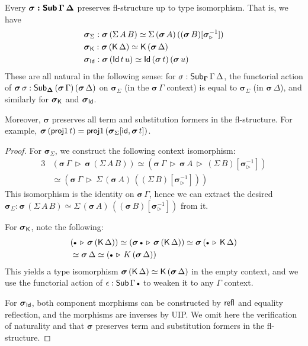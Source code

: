 \documentclass[sigplan,review,anonymous]{acmart}\settopmatter{printfolios=true,printccs=false,printacmref=false}
\newcommand{\ext}{\triangleright}
\newcommand{\emptycon}{\scaleobj{.75}\bullet}
\newcommand{\bGamma}{\boldsymbol{\Gamma}}
\newcommand{\bDelta}{\boldsymbol{\Delta}}
\newcommand{\bsigma}{\boldsymbol{\sigma}}
\begin{document}
\begin{theorem}\label{thm:flpres} Every $\boldsymbol{\sigma : \mathsf{Sub}\,\Gamma\,\Delta}$ preserves fl-structure up to type isomorphism. That is, we have
\begin{alignat*}{3}
  & \bsigma_{\Sigma} : \bsigma\,(\Sigma\,A\,B) \simeq \Sigma\,(\bsigma\,A)\,((\bsigma\,B)[\bsigma_{\ext}^{-1}]) \\
  & \bsigma_{\K} : \bsigma\,(\K\,\Delta) \simeq \K\,(\bsigma\,\Delta) \\
  & \bsigma_{\Id} : \bsigma\,(\Id\,t\,u) \simeq \Id\,(\bsigma\,t)\,(\bsigma\,u)
\end{alignat*}
These are all natural in the following sense: for $\sigma :
\Sub_{\bGamma}\,\Gamma\,\Delta$, the functorial action of $\bsigma\,\sigma :
\Sub_{\bDelta}\,(\bsigma\,\Gamma)\,(\bsigma\,\Delta)$ on $\bsigma_{\Sigma}$ (in
the $\bsigma\,\Gamma$ context) is equal to $\bsigma_{\Sigma}$ (in
$\bsigma\,\Delta$), and similarly for $\bsigma_{\K}$ and $\bsigma_{\Id}$.

Moreover, $\bsigma$ preserves all term and substitution formers in the
fl-structure. For example, $\bsigma\,(\proj1\,t) = \proj1\,
(\bsigma_{\Sigma}[\id, \bsigma\,t])$.
\end{theorem}
\begin{proof}
For $\bsigma_{\Sigma}$, we construct the following context isomorphism:
\begin{alignat*}{3}
& (\bsigma\,\Gamma\,\ext\,\bsigma\,(\Sigma\,A\,B)) \simeq
  (\bsigma\,\Gamma\,\ext\,\bsigma\,A\,\ext\,(\Sigma\,B)[\bsigma_{\ext}^{-1}]) \\
& \simeq (\bsigma\,\Gamma\,\ext\,\Sigma\,(\bsigma\,A)\,((\Sigma\,B)[\bsigma_{\ext}^{-1}]))
\end{alignat*}
This isomorphism is the identity on $\bsigma\,\Gamma$, hence we can extract the
desired $\bsigma_{\Sigma} : \bsigma\,(\Sigma\,A\,B) \simeq
\Sigma\,(\bsigma\,A)\,((\bsigma\,B)[\bsigma_{\ext}^{-1}])$ from it.

For $\bsigma_{\K}$, note the following:
\begin{alignat*}{3}
  & (\emptycon\,\ext\,\bsigma\,(\K\,\Delta)) \simeq
    (\bsigma\,\emptycon\,\ext\,\bsigma\,(\K\,\Delta)) \simeq
    \bsigma\,(\emptycon\,\ext\,\K\,\Delta)\\
  & \simeq \bsigma\,\Delta \simeq (\emptycon\,\ext\,K\,(\bsigma\,\Delta))
\end{alignat*}
This yields a type isomorphism $\bsigma\,(\K\,\Delta) \simeq
\K\,(\bsigma\,\Delta)$ in the empty context, and we use the functorial action of
$\epsilon : \Sub\,\Gamma\,\emptycon$ to weaken it to any $\Gamma$ context.

For $\bsigma_{\Id}$, both component morphisms can be constructed by $\mathsf{refl}$ and
equality reflection, and the morphisms are inverses by UIP. We omit here the
verification of naturality and that $\bsigma$ preserves term and substitution
formers in the fl-structure.
\end{proof}
\end{document}
